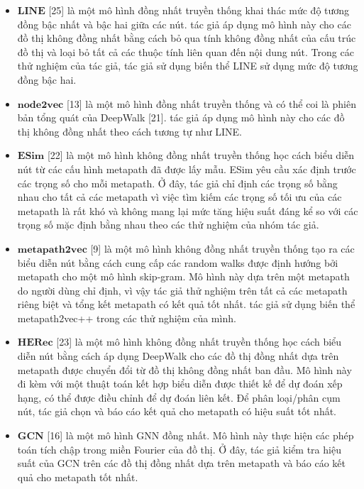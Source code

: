 \begin{table}[]
\begin{tabular}{|l|l|l|l|}
  \end{tabular}
  \end{table}

\begin{itemize}
  \item $\mathbf{LINE}$ [25] là một mô hình đồng nhất truyền thống khai thác mức độ tương đồng bậc nhất và bậc hai giữa các nút. tác giả áp dụng mô hình này cho các đồ thị không đồng nhất bằng cách bỏ qua tính không đồng nhất của cấu trúc đồ thị và loại bỏ tất cả các thuộc tính liên quan đến nội dung nút. Trong các thử nghiệm của tác giả, tác giả sử dụng biến thể LINE sử dụng mức độ tương đồng bậc hai.
  \item $\mathbf{node2vec}$ [13] là một mô hình đồng nhất truyền thống và có thể coi là phiên bản tổng quát của DeepWalk [21]. tác giả áp dụng mô hình này cho các đồ thị không đồng nhất theo cách tương tự như LINE.
  \item $\mathbf{ESim}$ [22] là một mô hình không đồng nhất truyền thống học cách biểu diễn nút từ các cấu hình metapath đã được lấy mẫu. ESim yêu cầu xác định trước các trọng số cho mỗi metapath. Ở đây, tác giả chỉ định các trọng số bằng nhau cho tất cả các metapath vì việc tìm kiếm  các trọng số tối ưu của các metapath là rất khó và không mang lại mức tăng hiệu suất đáng kể so với các trọng số mặc định bằng nhau theo các thử nghiệm của nhóm tác giả.
  \item $\mathbf{metapath2vec}$ [9] là một mô hình không đồng nhất truyền thống tạo ra các biểu diễn nút bằng cách cung cấp các random walks được định hướng bởi metapath cho một mô hình skip-gram. Mô hình này dựa trên một metapath do người dùng chỉ định, vì vậy tác giả thử nghiệm trên tất cả các metapath riêng biệt và tổng kết metapath có kết quả tốt nhất. tác giả sử dụng biến thể metapath2vec++ trong các thử nghiệm của mình. 
  \item $\mathbf{HERec}$ [23] là một mô hình không đồng nhất truyền thống học cách biểu diễn nút bằng cách áp dụng DeepWalk cho các đồ thị đồng nhất dựa trên metapath được chuyển đổi từ đồ thị không đồng nhất ban đầu. Mô hình này đi kèm với một thuật toán kết hợp biểu diễn được thiết kế để dự đoán xếp hạng, có thể được điều chỉnh để dự đoán liên kết. Để phân loại/phân cụm nút, tác giả chọn và báo cáo kết quả cho metapath có hiệu suất tốt nhất.
  \item $\mathbf{GCN}$ [16] là một mô hình GNN đồng nhất. Mô hình này thực hiện các phép toán tích chập trong miền Fourier của đồ thị. Ở đây, tác giả kiểm tra hiệu suất của GCN trên các đồ thị đồng nhất dựa trên metapath và báo cáo kết quả cho metapath tốt nhất.

\end{itemize}
